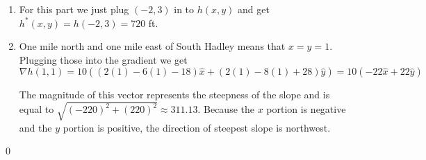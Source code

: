 \documentclass{homework}
\begin{document}
\begin{homeworkProblem}[Problem 1.12]
{\begin{enumerate}
        This yields the solution that $x = -2, y = 3$, which means that the peak is 3 miles north and two miles west of South Hadley.

        \item For this part we just plug $(-2, 3)$ in to $h(x, y)$ and get $h^*(x, y) = h(-2, 3)  = 720$ ft.
        \item One mile north and one mile east of South Hadley means that $x = y = 1$. Plugging those into the gradient we get $$\nabla h(1, 1) = 10\left((2(1) - 6(1) - 18) \hat{x} + (2(1) - 8(1) + 28) \hat{y} \right) = 10 \left(-22 \hat{x} + 22 \hat{y} \right)$$

        The magnitude of this vector represents the steepness of the slope and is equal to $\sqrt{(-220)^2 + (220)^2} \approx 311.13$. Because the $x$ portion is negative and the $y$ portion is positive, the direction of steepest slope is northwest.
      \end{enumerate} \qed
    }
  \end{homeworkProblem}
\end{document}
